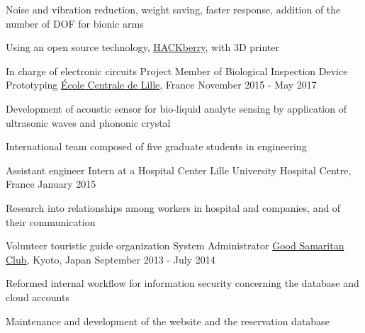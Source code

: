 \documentclass[12pt, a4paper]{cvncl}
\newcommand{\link}[2]{\href{#1}{#2}}
\begin{document}
\begin{cventries}
{\begin{cvitems}
		\item{Noise and vibration reduction, weight saving, faster response, addition of the number of DOF for bionic arms}
		\item{Using an open source technology, \link{http://exiii.jp/eng.html}{HACKberry}, with 3D printer}
	\end{cvitems}}
	\cventry
		{In charge of electronic circuits}
		{Project Member of Biological Inspection Device Prototyping}
		{\link{http://www.ec-lille.fr/en/index.html}{\'Ecole Centrale de Lille}, France}
		{November 2015 - May 2017}
		{\begin{cvitems}
			\item{Development of acoustic sensor for bio-liquid analyte sensing by application of ultrasonic waves and phononic crystal}
			\item{International team composed of five graduate students in engineering}
		\end{cvitems}}
	\cventry
		{Assistant engineer}
		{Intern at a Hospital Center}
		{Lille University Hospital Centre, France}
		{January 2015}
		{\begin{cvitems}
			\item Research into relationships among workers in hospital and companies, and of their communication
		\end{cvitems}}
\cventry
		{Volunteer touristic guide organization}
		{System Administrator}
		{\link{http://goodsamaritanclub.org}{Good Samaritan Club}, Kyoto, Japan}
		{September 2013 - July 2014}
		{\begin{cvitems}
		\item{Reformed internal workflow for information security concerning the database and cloud accounts}
		\item{Maintenance and development of the website and the reservation database}
		\end{cvitems}}
\end{cventries}
\end{document}
